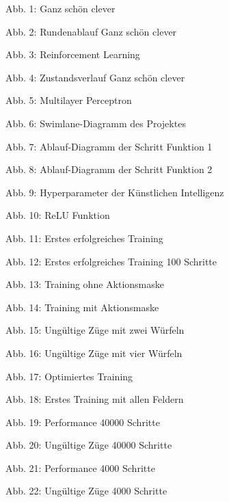 
Abb. 1: Ganz schön clever 

Abb. 2: Rundenablauf Ganz schön clever

Abb. 3: Reinforcement Learning

Abb. 4: Zustandsverlauf Ganz schön clever

Abb. 5: Multilayer Perceptron

Abb. 6: Swimlane-Diagramm des Projektes

Abb. 7: Ablauf-Diagramm der Schritt Funktion 1

Abb. 8: Ablauf-Diagramm der Schritt Funktion 2

Abb. 9: Hyperparameter der Künstlichen Intelligenz

Abb. 10: ReLU Funktion

Abb. 11: Erstes erfolgreiches Training

Abb. 12: Erstes erfolgreiches Training 100 Schritte

Abb. 13: Training ohne Aktionsmaske

Abb. 14: Training mit Aktionsmaske

Abb. 15: Ungültige Züge mit zwei Würfeln

Abb. 16: Ungültige Züge mit vier Würfeln

Abb. 17: Optimiertes Training

Abb. 18: Erstes Training mit allen Feldern

Abb. 19: Performance 40000 Schritte

Abb. 20: Ungültige Züge 40000 Schritte

Abb. 21: Performance 4000 Schritte

Abb. 22: Ungültige Züge 4000 Schritte

